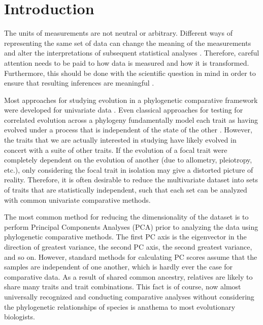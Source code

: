 \documentclass[a4paper,12pt]{article}
\begin{document}
\newpage

\section{Introduction}
The units of measurements are not neutral or arbitrary. Different ways of representing the same set of data can change the meaning of the measurements and alter the interpretations of subsequent statistical analyses \citep{Hand2004, HansenHoule2008, Houle2011}. Therefore, careful attention needs to be paid to how data is measured and how it is transformed. Furthermore, this should be done with the scientific question in mind in order to ensure that resulting inferences are meaningful \citep{Houle2011}. 

Most approaches for studying evolution in a phylogenetic comparative framework were developed for univariate data \citep[reviewed in][]{PennellHarmon}. Even classical approaches for testing for correlated evolution across a phylogeny \citep[e.g.,][]{Felsenstein1985, Grafen1989, HarveyPagel1991} fundamentally model each trait as having evolved under a process that is independent of the state of the other \citep{HansenOrzack2005}. However, the traits that we are actually interested in studying have likely evolved in concert with a suite of other traits. If the evolution of a focal trait were completely dependent on the evolution of another (due to allometry, pleiotropy, etc.), only considering the focal trait in isolation may give a distorted picture of reality.  Therefore, it is often desirable to reduce the multivariate dataset into sets of traits that are statistically independent, such that each set can be analyzed with common univariate comparative methods.

The most common method for reducing the dimensionality of the dataset is to perform Principal Components Analyses (PCA) prior to analyzing the data using phylogenetic comparative methods. The first PC axis is the eigenvector in the direction of greatest variance, the second PC axis, the second greatest variance, and so on. However, standard methods for calculating PC scores assume that the samples are independent of one another, which is hardly ever the case for comparative data. As a result of shared common ancestry, relatives are likely to share many traits and trait combinations. This fact is of course, now almost universally recognized and conducting comparative analyses without considering the phylogenetic relationships of species is anathema to most evolutionary biologists.
\end{document}
